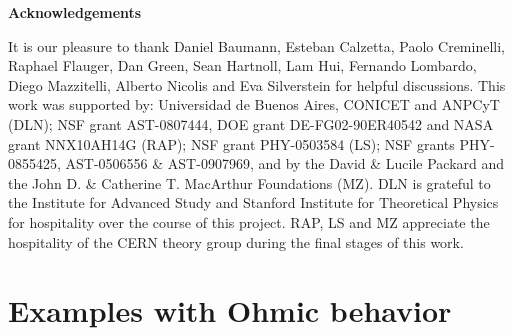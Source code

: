 \documentclass[11pt,amsmath,floats,floatfix,nofootinbib,secnumarabic, superscriptaddress, tightenlines]{revtex4}
\begin{document}
{\begin{center}
{\bf Acknowledgements}
\end{center}
It is our pleasure to thank Daniel Baumann, Esteban Calzetta, Paolo Creminelli, Raphael Flauger, Dan Green, Sean Hartnoll, Lam Hui, Fernando Lombardo, Diego Mazzitelli, Alberto Nicolis and Eva Silverstein for helpful discussions. This work was supported by: Universidad de Buenos Aires, CONICET and ANPCyT (DLN); NSF grant AST-0807444, DOE grant DE-FG02-90ER40542 and NASA grant NNX10AH14G (RAP); NSF grant PHY-0503584 (LS);  NSF grants PHY-0855425, AST-0506556 \& AST-0907969, and by the David \& Lucile Packard and the John D. \& Catherine T. MacArthur Foundations (MZ). DLN is grateful to the Institute for Advanced Study and Stanford Institute for Theoretical Physics for hospitality over the course of
this project. RAP, LS and MZ appreciate the hospitality of the CERN theory group during the final stages of this work.

\appendix

\section{Examples with Ohmic behavior}\label{app0}

}
\end{document}
